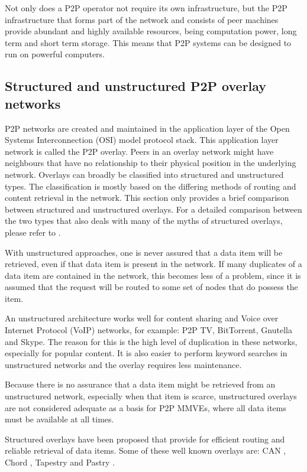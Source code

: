 Not only does a P2P operator not require its own infrastructure, but the P2P infrastructure that forms part of the network and consists of peer machines provide abundant and highly available resources, being computation power, long term and short term storage. This means that P2P systems can be designed to run on powerful computers.

\subsection{Structured and unstructured P2P overlay networks}
\label{overlays}

P2P networks are created and maintained in the application layer of the Open Systems Interconnection (OSI) model protocol stack. This application
layer network is called the P2P overlay. Peers in an overlay network might have neighbours that have no relationship to their physical position in
the underlying network. Overlays can broadly be classified into structured and unstructured types. The classification is mostly based on the
differing methods of routing and content retrieval in the network. This section only provides a brief comparison between structured and unstructured overlays. For a detailed comparison between the two types that also deals with many of the myths of structured overlays, please refer to
\cite{Castro_structured_overlay_myths}.

With unstructured approaches, one is never assured that a data item will be retrieved, even if that data item is present in the network. If many
duplicates of a data item are contained in the network, this becomes less of a problem, since it is assumed that the request will be routed to some
set of nodes that do  possess the item.

An unstructured architecture works well for content sharing and Voice over Internet Protocol (VoIP) networks, for example: P2P TV, BitTorrent,
Gnutella and Skype. The reason for this is the high level of duplication in these networks, especially for popular content. It is also easier to
perform keyword searches in unstructured networks and the overlay requires less maintenance.

Because there is no assurance that a data item might be retrieved from an unstructured network, especially when that item is scarce, unstructured
overlays are not considered adequate as a basis for P2P MMVEs, where all data items must be available at all times.

Structured overlays have been proposed that provide for efficient routing and reliable retrieval of data items. Some of these well known overlays
are: CAN \cite{CAN}, Chord \cite{chord}, Tapestry \cite{tapestry} and Pastry \cite{pastry}.

